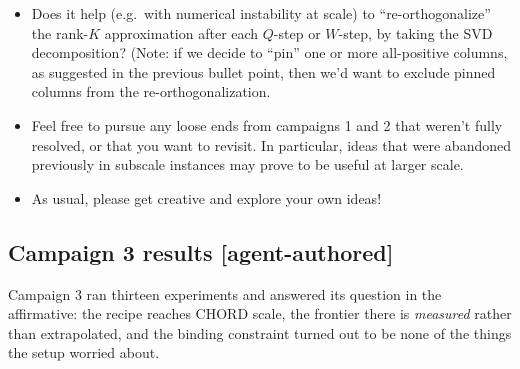 \documentclass{article}
\numberwithin{equation}{section}   %
\begin{document}
\begin{itemize}
 {\em What it does not fix.} It does not prevent the product $W q_\beta$ from going negative in
 channels where $\bar A_{\beta F} = 0$ -- that is what constraining every channel is for -- it
 only makes such a case repairable. And it does not address the solver's rank-dependent failures
 at $K \ge 128$, which are a conditioning problem, not a feasibility one. It is complementary to
 both: a certified feasible point is exactly what one would hand the solver as a warm start.

 {\em The measurement.} Compare the current recipe at rank $K$ against the pinned variant at the
 same rank $K$ (so $K-1$ learned columns plus one pinned), on at least one subbanded and one
 unsubbanded map, reporting $D$ and the LP failure counts. The interesting question is whether
 the pinned column costs a full unit of rank or a fraction of one: the leading SVD mode is
 already approximately the mean spectrum, so a pinned envelope may be largely reconstructing
 something the truncation would have spent a mode on anyway.

\item Does it help (e.g.\ with numerical instability at scale) to ``re-orthogonalize'' the
 rank-$K$ approximation after each $Q$-step or $W$-step, by taking the SVD decomposition? 
 (Note: if we decide to ``pin'' one or more all-positive columns, as suggested in the previous
 bullet point, then we'd want to exclude pinned columns from the re-orthogonalization.

\item Feel free to pursue any loose ends from campaigns 1 and 2 that weren't fully resolved,
 or that you want to revisit. 
 In particular, ideas that were abandoned previously in subscale instances may prove
 to be useful at larger scale.

\item
As usual, please get creative and explore your own ideas!

\end{itemize}

\subsection{Campaign 3 results [agent-authored]}
\label{ssec:campaign3_results}

Campaign 3 ran thirteen experiments and answered its question in the affirmative: the recipe
reaches CHORD scale, the frontier there is {\em measured} rather than extrapolated, and the
binding constraint turned out to be none of the things the setup worried about.
\end{document}
